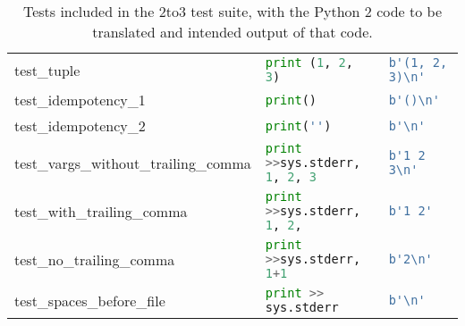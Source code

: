\begin{table*}
\begin{tabular}{@{}l|ll@{}}
    test\_tuple                           & \lstinline[language=Python, style=pythonstyle]|print (1, 2, 3)                                      | & \lstinline[language=Python, style=pythonstyle]|b'(1, 2, 3)\n'         | \\
    test\_idempotency\_1                  & \lstinline[language=Python, style=pythonstyle]|print()                                              | & \lstinline[language=Python, style=pythonstyle]|b'()\n'                | \\
    test\_idempotency\_2                  & \lstinline[language=Python, style=pythonstyle]|print('')                                            | & \lstinline[language=Python, style=pythonstyle]|b'\n'                  | \\
    test\_vargs\_without\_trailing\_comma & \lstinline[language=Python, style=pythonstyle]|print >>sys.stderr, 1, 2, 3| & \lstinline[language=Python, style=pythonstyle]|b'1 2 3\n'             | \\
    test\_with\_trailing\_comma           & \lstinline[language=Python, style=pythonstyle]|print >>sys.stderr, 1, 2,  | & \lstinline[language=Python, style=pythonstyle]|b'1 2'                                | \\
    test\_no\_trailing\_comma             & \lstinline[language=Python, style=pythonstyle]|print >>sys.stderr, 1+1    | & \lstinline[language=Python, style=pythonstyle]|b'2\n'                 | \\
    test\_spaces\_before\_file            & \lstinline[language=Python, style=pythonstyle]|print >> sys.stderr          | & \lstinline[language=Python, style=pythonstyle]|b'\n'                  | \\ \bottomrule
    \end{tabular}
    \caption{Tests included in the 2to3 test suite, with the Python 2 code to be translated and intended output of that code.}
    \label{table:tests}
\end{table*}
